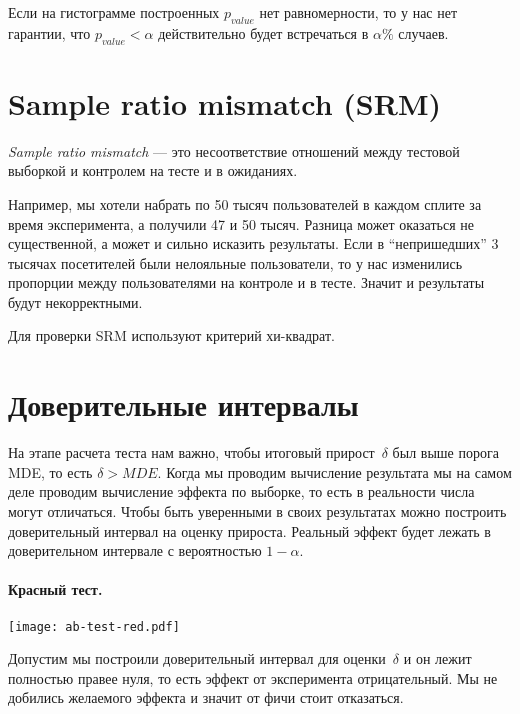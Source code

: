 \documentclass[../handbook.tex]{subfiles}
\begin{document}
Если на гистограмме построенных $p_{value}$ нет равномерности, то у нас нет
гарантии, что $p_{value} < \alpha$ действительно будет встречаться в $\alpha\%$
случаев.


\section{Sample ratio mismatch (SRM)}

\emph{Sample ratio mismatch} --- это несоответствие отношений между тестовой
выборкой и контролем на тесте и в ожиданиях.

Например, мы хотели набрать по 50 тысяч пользователей в каждом сплите за время
эксперимента, а получили 47 и 50 тысяч. Разница может оказаться не
существенной, а может и сильно исказить результаты. Если в ``непришедших'' 3
тысячах посетителей были нелояльные пользователи, то у нас изменились пропорции
между пользователями на контроле и в тесте. Значит и результаты будут
некорректными.

Для проверки SRM используют критерий хи-квадрат.

\section{Доверительные интервалы}
На этапе расчета теста нам важно, чтобы итоговый прирост~$\delta$ был выше
порога MDE, то есть $\delta > MDE$. Когда мы проводим вычисление результата мы на самом деле проводим
вычисление эффекта по выборке, то есть в реальности числа могут отличаться.
Чтобы быть уверенными в своих результатах можно построить доверительный
интервал на оценку прироста. Реальный эффект будет лежать в доверительном интервале с вероятностью $1 - \alpha$.

\paragraph{Красный тест.}
\begin{marginfigure}
    \texttt{[image: ab-test-red.pdf]}
\end{marginfigure}
Допустим мы построили доверительный интервал для оценки~$\delta$ и он лежит
полностью правее нуля, то есть эффект от эксперимента отрицательный. Мы не
добились желаемого эффекта и значит от фичи стоит отказаться.
\end{document}

